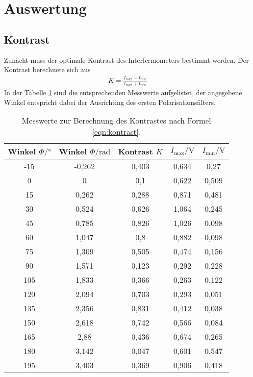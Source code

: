 \section{Auswertung}
\label{sec:Auswertung}
\subsection{Kontrast}
\label{sec:Kontrast}
Zunächt muss der optimale Kontrast des Interfermometers bestimmt
werden.
Der Kontrast berechnete sich aus
\begin{align}
K=\frac{I_\mathrm{max}-I_\mathrm{min}}{I_\mathrm{max}+I_\mathrm{min}}\label{eqn:kontrast}
\end{align}
In der Tabelle \ref{tab:kontrast}
sind die entsprechenden Messwerte aufgelistet, der angegebene Winkel
entspricht dabei der Ausrichting des ersten Polarisationsfilters.
\begin{table}
\centering
\caption{Messwerte zur Berechnung des Kontrastes nach Formel \eqref{eqn:kontrast}.}
\label{tab:kontrast}
\begin{tabular}{c c c c c}
\toprule
   Winkel $\Phi/\si{\degree}$&   Winkel $\Phi/\si{\radian}$ &  Kontrast $K$ &   $I_\mathrm{max}/\si{\volt}$ &    $I_\mathrm{min}/\si{\volt}$ \\
\midrule
    -15 &   -0,262 &      0,403 &   0,634 &    0,27  \\
      0 &    0     &      0,1   &   0,622 &    0,509 \\
     15 &    0,262 &      0,288 &   0,871 &    0,481 \\
     30 &    0,524 &      0,626 &   1,064 &    0,245 \\
     45 &    0,785 &      0,826 &   1,026 &    0,098 \\
     60 &    1,047 &      0,8   &   0,882 &    0,098 \\
     75 &    1,309 &      0,505 &   0,474 &    0,156 \\
     90 &    1,571 &      0,123 &   0,292 &    0,228 \\
    105 &    1,833 &      0,366 &   0,263 &    0,122 \\
    120 &    2,094 &      0,703 &   0,293 &    0,051 \\
    135 &    2,356 &      0,831 &   0,412 &    0,038 \\
    150 &    2,618 &      0,742 &   0,566 &    0,084 \\
    165 &    2,88  &      0,436 &   0,674 &    0,265 \\
    180 &    3,142 &      0,047 &   0,601 &    0,547 \\
    195 &    3,403 &      0,369 &   0,906 &    0,418 \\
\bottomrule
\end{tabular}
\end{table}

